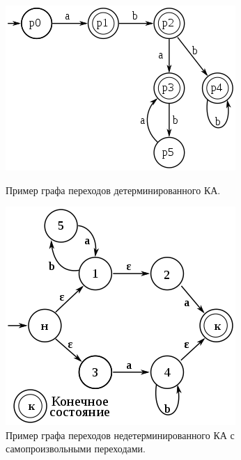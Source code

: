 \begin{figure}[H]
	\centering
	\begin{minipage}[b]{0.4\textwidth}
		\includegraphics[width=\textwidth]{images/dfa.png}
		\caption{Пример графа переходов детерминированного КА.}
	\end{minipage}
	\hfill
	\begin{minipage}[b]{0.4\textwidth}
		\includegraphics[width=\textwidth]{images/ndfa.png}
		\caption{Пример графа переходов недетерминированного КА с самопроизвольными переходами.}
	\end{minipage}
\end{figure}

